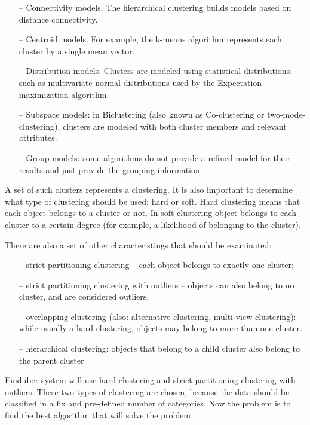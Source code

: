 \begin{enumerate}

\item[--] Connectivity models. The hierarchical clustering builds models based on distance connectivity.

\item[--] Centroid models. For example, the k-means algorithm represents each cluster by a single mean vector.

\item[--] Distribution models. Clusters are modeled using statistical distributions, such as multivariate normal distributions used by the Expectation-maximization algorithm.

\item[--] Subspace models: in Biclustering (also known as Co-clustering or two-mode-clustering), clusters are modeled with both cluster members and relevant attributes.

\item[--] Group models: some algorithms do not provide a refined model for their results and just provide the grouping information.

\end{enumerate}

A set of such clusters represents a clustering. It is also important to determine what type of clustering should be used: hard or soft. Hard clustering means that each object belongs to a cluster or not. In soft clustering object belongs to each cluster to a certain degree (for example, a likelihood of belonging to the cluster). 

There are also a set of other characteristings that should be examinated: 

\begin{enumerate}
\item[--] strict partitioning clustering -- each object belongs to exactly one cluster;

\item[--] strict partitioning clustering with outliers -- objects can also belong to no cluster, and are considered outliers.

\item[--] overlapping clustering (also: alternative clustering, multi-view clustering): while usually a hard clustering, objects may belong to more than one cluster.

\item[--] hierarchical clustering: objects that belong to a child cluster also belong to the parent cluster
\end{enumerate}

Finduber system will use hard clustering and strict partitioning clustering with outliers. These two types of clustering are chosen, because the data should be classified in a fix and pre-defined number of categories. Now the problem is to find the best algorithm that will solve the problem. 










